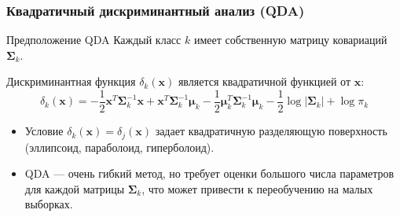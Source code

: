 \documentclass[notheorems, handout]{beamer}
\newcommand{\vect}[1]{\mathbf{#1}}
\newcommand{\matr}[1]{\boldsymbol{#1}}
\begin{document}
\begin{frame}
  \frametitle{Квадратичный дискриминантный анализ (QDA)}
  \begin{block}{Предположение QDA}
    Каждый класс $k$ имеет собственную матрицу ковариаций $\matr{\Sigma}_k$.
  \end{block}
  
  Дискриминантная функция $\delta_k(\vect{x})$ является квадратичной функцией от $\vect{x}$:
  $$ \delta_k(\vect{x}) = -\frac{1}{2}\vect{x}^T\matr{\Sigma}_k^{-1}\vect{x} + \vect{x}^T\matr{\Sigma}_k^{-1}\matr{\mu}_k - \frac{1}{2}\matr{\mu}_k^T\matr{\Sigma}_k^{-1}\matr{\mu}_k -\frac{1}{2}\log|\matr{\Sigma}_k| + \log \pi_k $$
  \begin{itemize}
    \item Условие $\delta_k(\vect{x}) = \delta_j(\vect{x})$ задает квадратичную разделяющую поверхность (эллипсоид, параболоид, гиперболоид).
    \item QDA --- очень гибкий метод, но требует оценки большого числа параметров для каждой матрицы $\matr{\Sigma}_k$, что может привести к переобучению на малых выборках.
  \end{itemize}
\end{frame}
\end{document}
